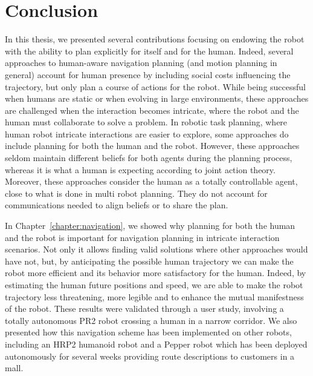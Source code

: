 \documentclass[a4paper,11pt,twoside]{StyleThese}
\begin{document}
\fi


\chapter*{Conclusion}

In this thesis, we presented several contributions focusing on endowing the robot with the ability to plan explicitly for itself and for the human. Indeed, several approaches to human-aware navigation planning (and motion planning in general) account for human presence by including social costs influencing the trajectory, but only plan a course of actions for the robot. While being successful when humans are static or when evolving in large environments, these approaches are challenged when the interaction becomes intricate, where the robot and the human must collaborate to solve a problem. In robotic task planning, where human robot intricate interactions are easier to explore, some approaches do include planning for both the human and the robot. However, these approaches seldom maintain different beliefs for both agents during the planning process, whereas it is what a human is expecting according to joint action theory. Moreover, these approaches consider the human as a totally controllable agent, close to what is done in multi robot planning. They do not account for communications needed to align beliefs or to share the plan.

In Chapter~\ref{chapter:navigation}, we showed why planning for both the human and the robot is important for navigation planning in intricate interaction scenarios. Not only it allows finding valid solutions where other approaches would have not, but, by anticipating the possible human trajectory we can make the robot more efficient and its behavior more satisfactory for the human.  Indeed, by estimating the human future positions and speed, we are able to make the robot trajectory less threatening, more legible and to enhance the mutual manifestness of the robot. These results were validated through a user study, involving a totally autonomous PR2 robot crossing a human in a narrow corridor. We also presented how this navigation scheme has been implemented on other robots, including an HRP2 humanoid robot and a Pepper robot which has been deployed autonomously for several weeks providing route descriptions to customers in a mall.
\end{document}
